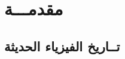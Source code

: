 \chapter*{مقدمـــة} %
\label{Chapter0} 
\renewcommand{\theequation}{\arabic{chapter}.\arabic{equation}}

\newcommand{\keyword}[1]{\textbf{#1}}
\newcommand{\tabhead}[1]{\textbf{#1}}
\newcommand{\code}[1]{\texttt{#1}}


\section*{تــاريخ الفيزياء الحديثة}




